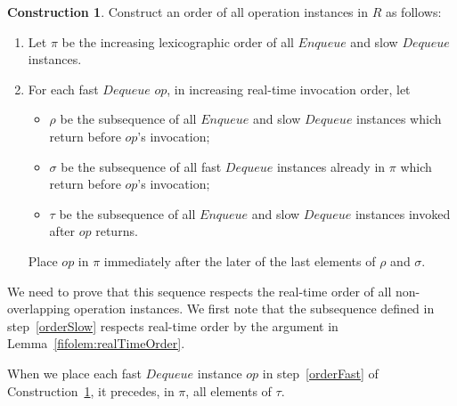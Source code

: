\documentclass[a4paper,anonymous,USenglish]{lipics-v2021}
\theoremstyle{definition}
\newtheorem{construction}{Construction}
\begin{document}
\begin{construction}\label{constr:relaxed}
  Construct an order of all operation instances in $R$ as follows:
  \begin{enumerate}
  \item Let $\pi$ be the increasing lexicographic order of all $Enqueue$ and slow $Dequeue$ instances. \label{orderSlow}
  \item For each fast $Dequeue$ $op$, in increasing real-time invocation order, let
    \begin{itemize}
    \item $\rho$ be the subsequence of all $Enqueue$ and slow $Dequeue$ instances which return before $op$'s invocation;
    \item $\sigma$ be the subsequence of all fast $Dequeue$ instances already in $\pi$ which return before $op$'s invocation;
    \item $\tau$ be the subsequence of all $Enqueue$ and slow $Dequeue$ instances invoked after $op$ returns.
    \end{itemize}
    Place $op$ in $\pi$ immediately after the later of the last elements of $\rho$ and $\sigma$.\label{orderFast}
  \end{enumerate}
\end{construction}


We need to prove that this sequence respects the real-time order of all non-overlapping operation instances.  We first note that the subsequence defined in step~\ref{orderSlow} respects real-time order by the argument in Lemma~\ref{fifolem:realTimeOrder}.

\begin{lemma}\label{ooolem:fastDeqOrdering}
  When we place each fast $Dequeue$ instance $op$ in step~\ref{orderFast} of Construction~\ref{constr:relaxed}, it precedes, in $\pi$, all elements of $\tau$.
\end{lemma}
\end{document}
